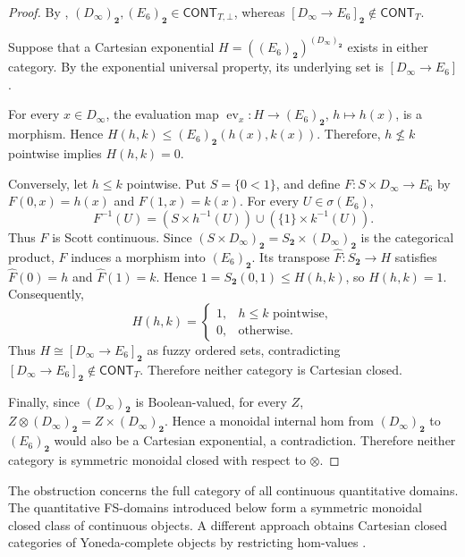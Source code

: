 \documentclass[preprint,3p,times]{elsarticle}
\theoremstyle{definition}
\theoremstyle{remark}
\newcommand{\CONT}{\mathsf{CONT}}
\newcommand{\ev}{\operatorname{ev}}
\numberwithin{equation}{section}
\begin{document}
\begin{proof}
By ,
\((D_\infty)_{\mathbf2},(E_6)_{\mathbf2}
\in\CONT_{T,\bot}\), whereas
\([D_\infty\to E_6]_{\mathbf2}\notin\CONT_T\).

Suppose that a Cartesian exponential
\(H=((E_6)_{\mathbf2})^{(D_\infty)_{\mathbf2}}\)
exists in either category. By the exponential
universal property, its underlying set is
\([D_\infty\to E_6]\).

For every \(x\in D_\infty\), the evaluation
map \(\ev_x:H\to(E_6)_{\mathbf2}\),
\(h\mapsto h(x)\), is a morphism. Hence
\(H(h,k)\leq(E_6)_{\mathbf2}(h(x),k(x))\).
Therefore, \(h\nleq k\) pointwise implies
\(H(h,k)=0\).

Conversely, let \(h\leq k\) pointwise.
Put \(S=\{0<1\}\), and define
\(F:S\times D_\infty\to E_6\) by
\(F(0,x)=h(x)\) and \(F(1,x)=k(x)\).
For every \(U\in\sigma(E_6)\),
\[
F^{-1}(U)
=(S\times h^{-1}(U))
\cup(\{1\}\times k^{-1}(U)).
\]
Thus \(F\) is Scott continuous.
Since \((S\times D_\infty)_{\mathbf2}
=S_{\mathbf2}\times(D_\infty)_{\mathbf2}\)
is the categorical product, \(F\) induces
a morphism into \((E_6)_{\mathbf2}\).
Its transpose \(\widehat F:S_{\mathbf2}\to H\)
satisfies \(\widehat F(0)=h\) and
\(\widehat F(1)=k\). Hence
\(1=S_{\mathbf2}(0,1)\leq H(h,k)\),
so \(H(h,k)=1\).
Consequently,
\[
H(h,k)=
\begin{cases}
1,&h\leq k\text{ pointwise},\\
0,&\text{otherwise}.
\end{cases}
\]
Thus \(H\cong[D_\infty\to E_6]_{\mathbf2}\)
as fuzzy ordered sets, contradicting
\([D_\infty\to E_6]_{\mathbf2}\notin\CONT_T\).
Therefore neither category is Cartesian closed.

Finally, since \((D_\infty)_{\mathbf2}\)
is Boolean-valued, for every \(Z\),
\(Z\otimes(D_\infty)_{\mathbf2}
=Z\times(D_\infty)_{\mathbf2}\).
Hence a monoidal internal hom from
\((D_\infty)_{\mathbf2}\) to
\((E_6)_{\mathbf2}\) would also be a
Cartesian exponential, a contradiction.
Therefore neither category is symmetric
monoidal closed with respect to \(\otimes\).
\end{proof}




The obstruction concerns the full category of all continuous quantitative domains. The quantitative FS-domains introduced below form a symmetric monoidal closed class of continuous objects. A different approach obtains Cartesian closed categories of Yoneda-complete objects by restricting hom-values \cite{LaiLuo2025}.
\end{document}
